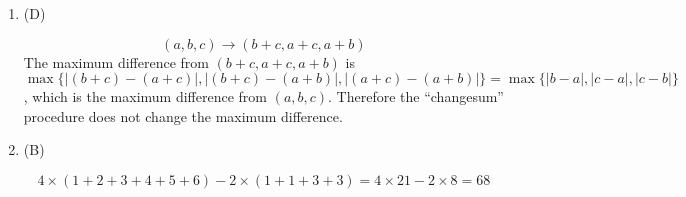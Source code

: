 \documentclass{article}
\begin{document}
\begin{enumerate}
\item (D)
\begin{solution}
\[
(a, b, c) \to (b+c, a+c, a+b)
\]
The maximum difference from $(b+c, a+c, a+b)$
is $\max\{|(b+c)-(a+c)|, |(b+c)-(a+b)|, |(a+c)-(a+b)|\} = \max\{|b-a|, |c-a|, |c-b|\}$,
which is the maximum difference from $(a,b,c)$.
Therefore the ``changesum'' procedure does not change the maximum difference.
\end{solution}

\item (B)
\begin{solution}
\end{solution}
\[
4 \times (1+2+3+4+5+6) - 2 \times (1 + 1 + 3 + 3) = 4 \times 21 - 2 \times 8 = 68
\]

\end{enumerate}
\end{document}
